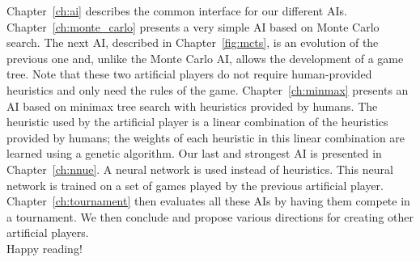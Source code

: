 \documentclass[12pt,a4paper,twoside,openright]{book}
\begin{document}
Chapter~\ref{ch:ai} describes the common interface for our different AIs. Chapter~\ref{ch:monte_carlo} presents a very simple AI based on Monte Carlo search. The next AI, described in Chapter~\ref{fig:mcts}, is an evolution of the previous one and, unlike the Monte Carlo AI, allows the development of a game tree. Note that these two artificial players do not require human-provided heuristics and only need the rules of the game. Chapter~\ref{ch:minmax} presents an AI based on minimax tree search with heuristics provided by humans. The heuristic used by the artificial player is a linear combination of the heuristics provided by humans; the weights of each heuristic in this linear combination are learned using a genetic algorithm. Our last and strongest AI is presented in Chapter~\ref{ch:nnue}. A neural network is used instead of heuristics. This neural network is trained on a set of games played by the previous artificial player.\\


Chapter~\ref{ch:tournament} then evaluates all these AIs by having them compete in a tournament. We then conclude and propose various directions for creating other artificial players.\\


Happy reading!




\end{document}
